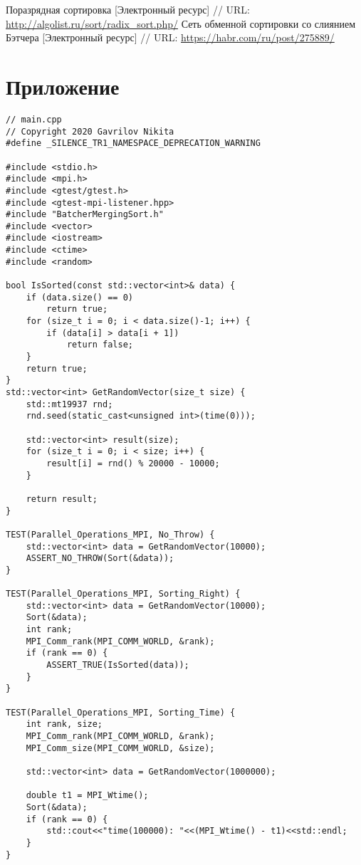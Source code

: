 \documentclass{report}
\begin{document}
\newpage
\begin{thebibliography}{1}
 Поразрядная сортировка [Электронный ресурс] // URL: \url{http://algolist.ru/sort/radix_sort.php/}
 Сеть обменной сортировки со слиянием Бэтчера [Электронный ресурс] // URL: \url{https://habr.com/ru/post/275889/}
\end{thebibliography}

\newpage
\section*{Приложение}
\begin{lstlisting}
// main.cpp
// Copyright 2020 Gavrilov Nikita
#define _SILENCE_TR1_NAMESPACE_DEPRECATION_WARNING

#include <stdio.h>
#include <mpi.h>
#include <gtest/gtest.h>
#include <gtest-mpi-listener.hpp>
#include "BatcherMergingSort.h"
#include <vector>
#include <iostream>
#include <ctime>
#include <random>

bool IsSorted(const std::vector<int>& data) {
    if (data.size() == 0)
        return true;
    for (size_t i = 0; i < data.size()-1; i++) {
        if (data[i] > data[i + 1])
            return false;
    }
    return true;
}
std::vector<int> GetRandomVector(size_t size) {
    std::mt19937 rnd;
    rnd.seed(static_cast<unsigned int>(time(0)));

    std::vector<int> result(size);
    for (size_t i = 0; i < size; i++) {
        result[i] = rnd() % 20000 - 10000;
    }

    return result;
}

TEST(Parallel_Operations_MPI, No_Throw) {
    std::vector<int> data = GetRandomVector(10000);
    ASSERT_NO_THROW(Sort(&data));
}

TEST(Parallel_Operations_MPI, Sorting_Right) {
    std::vector<int> data = GetRandomVector(10000);
    Sort(&data);
    int rank;
    MPI_Comm_rank(MPI_COMM_WORLD, &rank);
    if (rank == 0) {
        ASSERT_TRUE(IsSorted(data));
    }
}

TEST(Parallel_Operations_MPI, Sorting_Time) {
    int rank, size;
    MPI_Comm_rank(MPI_COMM_WORLD, &rank);
    MPI_Comm_size(MPI_COMM_WORLD, &size);
	
    std::vector<int> data = GetRandomVector(1000000);
	
    double t1 = MPI_Wtime();
    Sort(&data);
    if (rank == 0) {
		std::cout<<"time(100000): "<<(MPI_Wtime() - t1)<<std::endl;
    }
}


\end{lstlisting}
\end{document}
